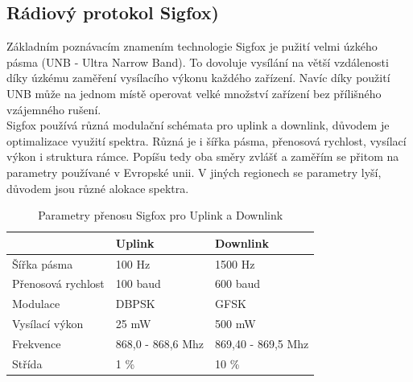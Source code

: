 \documentclass{ctuthesis}
\begin{document}
\subsection{Rádiový protokol Sigfox)}

Základním poznávacím znamením technologie Sigfox je pužití velmi úzkého pásma (UNB - Ultra Narrow Band). To dovoluje vysílání na větší vzdálenosti díky úzkému zaměření vysílacího výkonu každého zařízení. Navíc díky použití UNB může na jednom místě operovat velké množství zařízení bez přílišného vzájemného rušení. \\
Sigfox používá různá modulační schémata pro uplink a downlink, důvodem je optimalizace využití spektra. Různá je i šířka pásma, přenosová rychlost, vysílací výkon i struktura rámce. Popíšu tedy oba směry zvlášť a zaměřím se přitom na parametry používané v Evropské unii. V jiných regionech se parametry lyší, důvodem jsou různé alokace spektra.

\begin{table}[]
\begin{tabular}{@{}ll|l@{}}
\toprule
                   & Uplink            & Downlink           \\ \midrule
Šířka pásma        & 100 Hz            & 1500 Hz            \\
Přenosová rychlost & 100 baud          & 600 baud           \\
Modulace           & DBPSK             & GFSK               \\
Vysílací výkon     & 25 mW             & 500 mW             \\
Frekvence          & 868,0 - 868,6 Mhz & 869,40 - 869,5 Mhz \\
Střída             & 1 \%              & 10 \%             
\end{tabular}
\caption{Parametry přenosu Sigfox pro Uplink a Downlink}
\label{tab:upAndDown}
\cite{sigfoxsystem}
\end{table}
\end{document}
